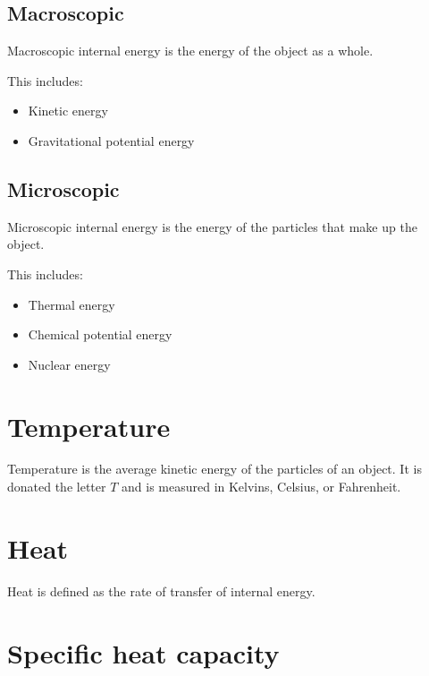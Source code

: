 \documentclass{book}
\newenvironment{generalInformation}{}{}
\begin{document}
\subsection{Macroscopic}
\begin{generalInformation}
    Macroscopic internal energy is the energy of the object as a whole.

    This includes:
    \begin{itemize}
        \item Kinetic energy
        \item Gravitational potential energy
    \end{itemize}
\end{generalInformation}

\subsection{Microscopic}
\begin{generalInformation}
    Microscopic internal energy is the energy of the particles that make up the object.

    This includes:
    \begin{itemize}
        \item Thermal energy
        \item Chemical potential energy
        \item Nuclear energy
    \end{itemize}
\end{generalInformation}


\section{Temperature}
\begin{generalInformation}
    Temperature is the average kinetic energy of the particles of an object.  It is donated the letter $T$ and is measured in Kelvins, Celsius, or Fahrenheit.
\end{generalInformation}

\section{Heat}
\begin{generalInformation}
    Heat is defined as the rate of transfer of internal energy.  
\end{generalInformation}


\section{Specific heat capacity}
\end{document}
